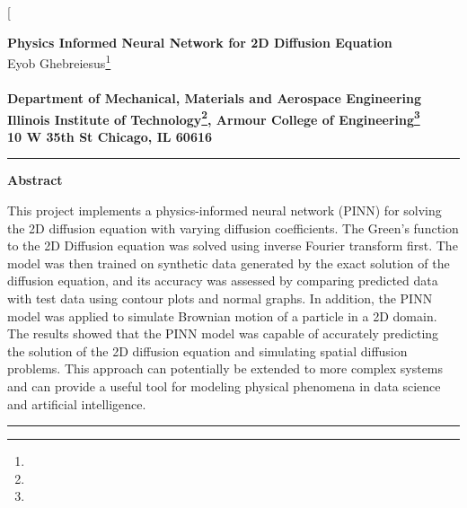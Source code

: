 \documentclass[letterpaper,11.8pt, twocolumn]{article}
\newcommand{\HRule}{\rule{\linewidth}{0.5mm}}
\renewcommand{\thefootnote}{\fnsymbol{footnote}}
\begin{document}
% 
% 

\twocolumn[\begin{@twocolumnfalse}
\begin{center}
\large\textbf{Physics Informed Neural Network for 2D Diffusion Equation} \\ \vspace{.18in}
Eyob Ghebreiesus\footnote{} \\
\\ \vspace{.2in}
\renewcommand{\thefootnote}{\alph{footnote}}
\small{\textbf{Department of Mechanical, Materials and Aerospace Engineering\\ 
Illinois Institute of Technology\footnote{}, Armour College of Engineering\footnote{} \\
10 W 35th St Chicago, IL 60616}}
\end{center}
\HRule
\begin{center}
\large\textbf{Abstract}\\
\end{center}
 This project implements a physics-informed neural network (PINN) for solving the 2D diffusion equation with varying diffusion coefficients. The Green's function to the 2D Diffusion equation was solved using inverse Fourier transform first. The model was then trained on synthetic data generated by the exact solution of the diffusion equation, and its accuracy was assessed by comparing predicted data with test data using contour plots and normal graphs. In addition, the PINN model was applied to simulate Brownian motion of a particle in a 2D domain. The results showed that the PINN model was capable of accurately predicting the solution of the 2D diffusion equation and simulating spatial diffusion problems. This approach can potentially be extended to more complex systems and can provide a useful tool for modeling physical phenomena in data science and artificial intelligence. \\
\HRule


\end{@twocolumnfalse}
\end{document}
